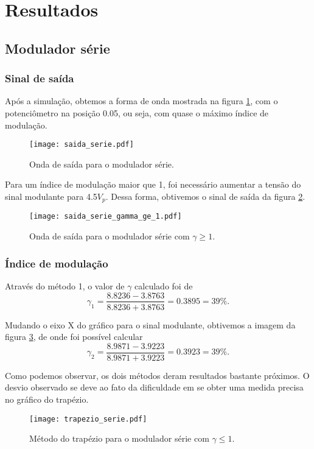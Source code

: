\newpage
\section{Resultados}

\subsection{Modulador série}

\subsubsection{Sinal de saída}
Após a simulação, obtemos a forma de onda mostrada na figura \ref{f_saida_serie}, com o potenciômetro na posição 0.05, ou seja, com quase o máximo índice de modulação.

\begin{figure}[H]
    \centering
    \caption{Onda de saída para o modulador série.}
    \texttt{[image: saida\_serie.pdf]}
    \label{f_saida_serie}
\end{figure}

Para um índice de modulação maior que 1, foi necessário aumentar a tensão do sinal modulante para 4.5$V_p$. Dessa forma, obtivemos o sinal de saída da figura \ref{f_saida_serie_gamma_ge_1}.

\begin{figure}[H]
    \centering
    \caption{Onda de saída para o modulador série com $\gamma \ge 1$.}
    \texttt{[image: saida\_serie\_gamma\_ge\_1.pdf]}
    \label{f_saida_serie_gamma_ge_1}
\end{figure}

\subsubsection{Índice de modulação}
Através do método 1, o valor de $\gamma$ calculado foi de 
\[ 
\gamma_1 = \frac{8.8236-3.8763}{8.8236+3.8763} = 0.3895 = 39\%.
\]

Mudando o eixo X do gráfico para o sinal modulante, obtivemos a imagem da figura \ref{f_trapezio_serie}, de onde foi possível calcular
\[
\gamma_2 = \frac{8.9871-3.9223}{8.9871+3.9223} = 0.3923 = 39\%.
\]

Como podemos observar, os dois métodos deram resultados bastante próximos.
O desvio observado se deve ao fato da dificuldade em se obter uma medida precisa no gráfico do trapézio.

\begin{figure}[H]
    \centering
    \caption{Método do trapézio para o modulador série com $\gamma \le 1$.}
    \texttt{[image: trapezio\_serie.pdf]}
    \label{f_trapezio_serie}
\end{figure}

